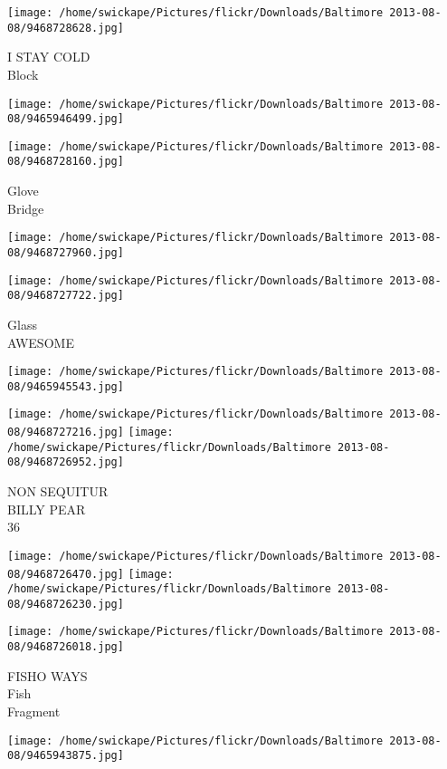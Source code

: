 \documentclass[10pt,letterpaper]{article}
\begin{document}
\vspace{0.25in}
\texttt{[image: /home/swickape/Pictures/flickr/Downloads/Baltimore 2013-08-08/9468728628.jpg]}

I STAY COLD\\
Block
\pagebreak

\texttt{[image: /home/swickape/Pictures/flickr/Downloads/Baltimore 2013-08-08/9465946499.jpg]}

\vspace{0.25in}
\texttt{[image: /home/swickape/Pictures/flickr/Downloads/Baltimore 2013-08-08/9468728160.jpg]}

Glove\\
Bridge
\pagebreak

\texttt{[image: /home/swickape/Pictures/flickr/Downloads/Baltimore 2013-08-08/9468727960.jpg]}

\vspace{0.25in}
\texttt{[image: /home/swickape/Pictures/flickr/Downloads/Baltimore 2013-08-08/9468727722.jpg]}

Glass\\
AWESOME
\pagebreak

\texttt{[image: /home/swickape/Pictures/flickr/Downloads/Baltimore 2013-08-08/9465945543.jpg]}

\vspace{0.25in}
\texttt{[image: /home/swickape/Pictures/flickr/Downloads/Baltimore 2013-08-08/9468727216.jpg]}
\texttt{[image: /home/swickape/Pictures/flickr/Downloads/Baltimore 2013-08-08/9468726952.jpg]}

NON SEQUITUR\\
BILLY PEAR\\
36
\pagebreak

\texttt{[image: /home/swickape/Pictures/flickr/Downloads/Baltimore 2013-08-08/9468726470.jpg]}
\texttt{[image: /home/swickape/Pictures/flickr/Downloads/Baltimore 2013-08-08/9468726230.jpg]}

\vspace{0.25in}
\texttt{[image: /home/swickape/Pictures/flickr/Downloads/Baltimore 2013-08-08/9468726018.jpg]}

FISHO WAYS\\
Fish\\
Fragment
\pagebreak

\texttt{[image: /home/swickape/Pictures/flickr/Downloads/Baltimore 2013-08-08/9465943875.jpg]}
\end{document}
